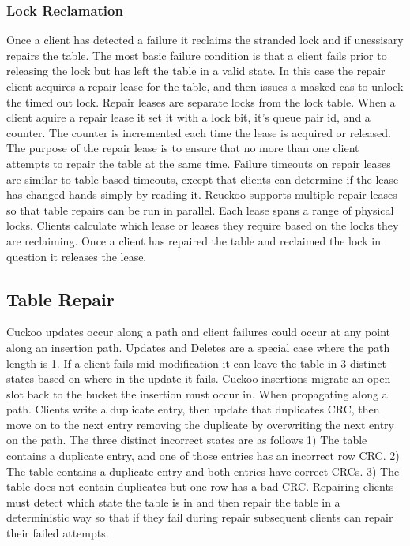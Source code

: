 
\subsubsection{Lock Reclamation}

Once a client has detected
a failure it reclaims the stranded lock and if unessisary
repairs the table. The most basic failure condition is that
a client fails prior to releasing the lock but has left the
table in a valid state. In this case the repair client
acquires a repair lease for the table, and then issues a
masked cas to unlock the timed out lock. Repair leases are
separate locks from the lock table. When a client aquire a
repair lease it set it with a lock bit, it's queue pair id,
and a counter. The counter is incremented each time the
lease is acquired or released. The purpose of the repair
lease is to ensure that no more than one client attempts to
repair the table at the same time. Failure timeouts on
repair leases are similar to table based timeouts, except
that clients can determine if the lease has changed hands
simply by reading it. Rcuckoo supports multiple repair
leases so that table repairs can be run in parallel. Each
lease spans a range of physical locks. Clients calculate
which lease or leases they require based on the locks they
are reclaiming. Once a client has repaired the table and
reclaimed the lock in question it releases the lease.

\subsection{Table Repair} 
\label{sec:table-repair}

Cuckoo updates occur along a path
and client failures could occur at any point along an
insertion path. Updates and Deletes are a special case where
the path length is 1. If a client fails mid modification it
can leave the table in 3 distinct states based on where in
the update it fails. Cuckoo insertions migrate an open slot
back to the bucket the insertion must occur in. When
propagating along a path. Clients write a duplicate entry,
then update that duplicates CRC, then move on to the next
entry removing the duplicate by overwriting the next entry
on the path. The three distinct incorrect states are as
follows 1) The table contains a duplicate entry, and one of
those entries has an incorrect row CRC. 2) The table
contains a duplicate entry and both entries have correct
CRCs. 3) The table does not contain duplicates but one row
has a bad CRC. Repairing clients must detect which state the
table is in and then repair the table in a deterministic way
so that if they fail during repair subsequent clients can
repair their failed attempts.

